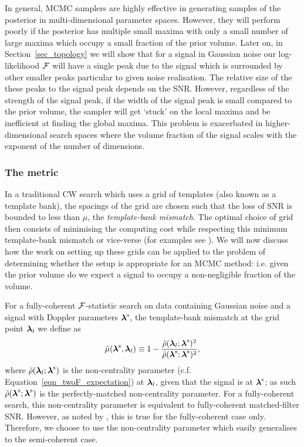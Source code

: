 \documentclass[aps, prd, twocolumn, superscriptaddress, floatfix, showpacs, nofootinbib, longbibliography]{revtex4-1}
\begin{document}
In general, MCMC samplers are highly effective in generating samples of the
posterior in multi-dimensional parameter spaces. However, they will perform
poorly if the posterior has multiple small maxima with only a small number of
large maxima which occupy a small fraction of the prior volume. Later on, in
Section~\ref{sec_topology} we will show that for a signal in Gaussian noise our
log-likelihood ${\mathcal{F}}$ will have a single peak due to the signal which is
surrounded by other smaller peaks particular to given noise realisation. The relative
size of the these peaks to the signal peak depends on the SNR.  However,
regardless of the strength of the signal peak, if the width of the signal peak
is small compared to the prior volume, the sampler will get `stuck' on the
local maxima and be inefficient at finding the global maxima.  This problem is
exacerbated in higher-dimensional search spaces where the volume fraction of
the signal scales with the exponent of the number of dimensions.

\subsubsection{The metric}

In a traditional CW search which uses a grid of templates (also known as a
template bank), the spacings of the grid are chosen such that the loss of
SNR is bounded to less than $\mu$, the
\emph{template-bank mismatch}. The optimal choice of grid then consists of
minimising the computing cost while respecting this minimum template-bank
mismatch or vice-verse (for examples see \citet{pletsch2010, prix2012,
wette2013, wette2015}). We will now discuss how the work on setting up these
grids can be applied to the problem of determining whether the setup is
appropriate for an MCMC method: i.e. given the prior volume do we expect a
signal to occupy a non-negligible fraction of the volume.

For a fully-coherent ${\mathcal{F}}$-statistic search on data containing Gaussian noise
and a signal with Doppler parameters $\boldsymbol{\mathbf{\lambda}}^{\rm s}$, the template-bank
mismatch at the grid point $\boldsymbol{\mathbf{\lambda}}_{l}$ we define as
\begin{align}
\tilde{\mu}(\boldsymbol{\mathbf{\lambda}}^{\rm s}, \boldsymbol{\mathbf{\lambda}}_{l}) \equiv 1 -
\frac{\tilde{\rho}(\boldsymbol{\mathbf{\lambda}}_l;\boldsymbol{\mathbf{\lambda}}^{\rm s})^{2}}
{\tilde{\rho}(\boldsymbol{\mathbf{\lambda}}^{\rm s}; \boldsymbol{\mathbf{\lambda}}^{\rm s})^{2}},
\end{align}
where $\tilde{\rho}(\boldsymbol{\mathbf{\lambda}}_l; \boldsymbol{\mathbf{\lambda}}^{\rm s})$ is the non-centrality
parameter (c.f. Equation~\ref{eqn_twoF_expectation}) at $\boldsymbol{\mathbf{\lambda}}_l$, given
that the signal is at $\boldsymbol{\mathbf{\lambda}}^{\rm s}$; as such $\tilde{\rho}(\boldsymbol{\mathbf{\lambda}}^{\rm s};
\boldsymbol{\mathbf{\lambda}}^{\rm s})$ is the perfectly-matched non-centrality parameter.  For a
fully-coherent search, this non-centrality parameter is equivalent to
fully-coherent matched-filter SNR. However, as noted by
\citet{leaci2015}, this is true for the fully-coherent case only.  Therefore,
we choose to use the non-centrality parameter which easily generalises to the
semi-coherent case.
\end{document}
